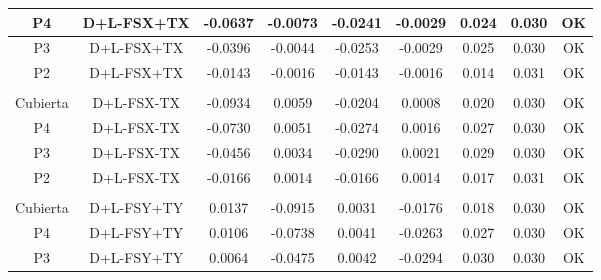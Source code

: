 \begin{table}[H]
{\begin{tabular}{|c|c|c|c|c|c|c|c|c|}
    \hline
    P4  & D+L-FSX+TX & -0.0637 & -0.0073 & -0.0241 & -0.0029 & 0.024 & 0.030 & \cellcolor[rgb]{ .776,  .937,  .808}\textcolor[rgb]{ 0,  .38,  0}{OK} \bigstrut\\
    \hline
    P3  & D+L-FSX+TX & -0.0396 & -0.0044 & -0.0253 & -0.0029 & 0.025 & 0.030 & \cellcolor[rgb]{ .776,  .937,  .808}\textcolor[rgb]{ 0,  .38,  0}{OK} \bigstrut\\
    \hline
    P2  & D+L-FSX+TX & -0.0143 & -0.0016 & -0.0143 & -0.0016 & 0.014 & 0.031 & \cellcolor[rgb]{ .776,  .937,  .808}\textcolor[rgb]{ 0,  .38,  0}{OK} \bigstrut\\
    \hline
    \multicolumn{1}{|r}{} & \multicolumn{1}{r}{} & \multicolumn{1}{r}{} & \multicolumn{1}{r}{} & \multicolumn{1}{r}{} & \multicolumn{1}{r}{} & \multicolumn{1}{r}{} & \multicolumn{1}{r}{} &  \bigstrut\\
    \hline
    Cubierta & D+L-FSX-TX & -0.0934 & 0.0059 & -0.0204 & 0.0008 & 0.020 & 0.030 & \cellcolor[rgb]{ .776,  .937,  .808}\textcolor[rgb]{ 0,  .38,  0}{OK} \bigstrut\\
    \hline
    P4  & D+L-FSX-TX & -0.0730 & 0.0051 & -0.0274 & 0.0016 & 0.027 & 0.030 & \cellcolor[rgb]{ .776,  .937,  .808}\textcolor[rgb]{ 0,  .38,  0}{OK} \bigstrut\\
    \hline
    P3  & D+L-FSX-TX & -0.0456 & 0.0034 & -0.0290 & 0.0021 & 0.029 & 0.030 & \cellcolor[rgb]{ .776,  .937,  .808}\textcolor[rgb]{ 0,  .38,  0}{OK} \bigstrut\\
    \hline
    P2  & D+L-FSX-TX & -0.0166 & 0.0014 & -0.0166 & 0.0014 & 0.017 & 0.031 & \cellcolor[rgb]{ .776,  .937,  .808}\textcolor[rgb]{ 0,  .38,  0}{OK} \bigstrut\\
    \hline
    \multicolumn{1}{|r}{} & \multicolumn{1}{r}{} & \multicolumn{1}{r}{} & \multicolumn{1}{r}{} & \multicolumn{1}{r}{} & \multicolumn{1}{r}{} & \multicolumn{1}{r}{} & \multicolumn{1}{r}{} &  \bigstrut\\
    \hline
    Cubierta & D+L-FSY+TY & 0.0137 & -0.0915 & 0.0031 & -0.0176 & 0.018 & 0.030 & \cellcolor[rgb]{ .776,  .937,  .808}\textcolor[rgb]{ 0,  .38,  0}{OK} \bigstrut\\
    \hline
    P4  & D+L-FSY+TY & 0.0106 & -0.0738 & 0.0041 & -0.0263 & 0.027 & 0.030 & \cellcolor[rgb]{ .776,  .937,  .808}\textcolor[rgb]{ 0,  .38,  0}{OK} \bigstrut\\
    \hline
    P3  & D+L-FSY+TY & 0.0064 & -0.0475 & 0.0042 & -0.0294 & 0.030 & 0.030 & \cellcolor[rgb]{ .776,  .937,  .808}\textcolor[rgb]{ 0,  .38,  0}{OK} \bigstrut\\

\end{tabular}}
\end{table}
